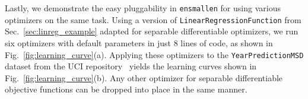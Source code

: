 \documentclass{article}
\begin{document}
%

Lastly, we demonstrate the easy pluggability in {\tt ensmallen}
for using various optimizers on the same task.
Using a version of \texttt{\small LinearRegressionFunction} from Sec.~\ref{sec:linreg_example}
adapted for separable differentiable optimizers,
we run six optimizers with default parameters in just 8 lines of code,
as shown in Fig.~\ref{fig:learning_curve}(a).
Applying these optimizers to the \texttt{\small YearPredictionMSD}
dataset from the UCI repository~\cite{ucimlrepository}
yields the learning curves shown in Fig.~\ref{fig:learning_curve}(b).
Any other optimizer for separable differentiable objective
functions can be dropped into place in the same manner.
\end{document}
